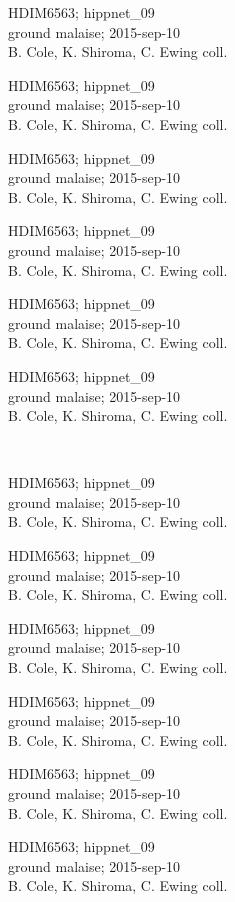 \documentclass[2pt]{extarticle}
\begin{document}
\noindent
\parbox{0.16\textwidth}{\tiny \raggedright \rule[-0.3\baselineskip]{0pt}{10pt}HDIM6563; hippnet\_09\\ ground malaise; 2015-sep-10\\ B. Cole, K. Shiroma, C. Ewing coll.}
\parbox{0.16\textwidth}{\tiny \raggedright \rule[-0.3\baselineskip]{0pt}{10pt}HDIM6563; hippnet\_09\\ ground malaise; 2015-sep-10\\ B. Cole, K. Shiroma, C. Ewing coll.}
\parbox{0.16\textwidth}{\tiny \raggedright \rule[-0.3\baselineskip]{0pt}{10pt}HDIM6563; hippnet\_09\\ ground malaise; 2015-sep-10\\ B. Cole, K. Shiroma, C. Ewing coll.}
\parbox{0.16\textwidth}{\tiny \raggedright \rule[-0.3\baselineskip]{0pt}{10pt}HDIM6563; hippnet\_09\\ ground malaise; 2015-sep-10\\ B. Cole, K. Shiroma, C. Ewing coll.}
\parbox{0.16\textwidth}{\tiny \raggedright \rule[-0.3\baselineskip]{0pt}{10pt}HDIM6563; hippnet\_09\\ ground malaise; 2015-sep-10\\ B. Cole, K. Shiroma, C. Ewing coll.}
\parbox{0.16\textwidth}{\tiny \raggedright \rule[-0.3\baselineskip]{0pt}{10pt}HDIM6563; hippnet\_09\\ ground malaise; 2015-sep-10\\ B. Cole, K. Shiroma, C. Ewing coll.} \\ 
\vspace{0.001in} 

\noindent
\parbox{0.16\textwidth}{\tiny \raggedright \rule[-0.3\baselineskip]{0pt}{10pt}HDIM6563; hippnet\_09\\ ground malaise; 2015-sep-10\\ B. Cole, K. Shiroma, C. Ewing coll.}
\parbox{0.16\textwidth}{\tiny \raggedright \rule[-0.3\baselineskip]{0pt}{10pt}HDIM6563; hippnet\_09\\ ground malaise; 2015-sep-10\\ B. Cole, K. Shiroma, C. Ewing coll.}
\parbox{0.16\textwidth}{\tiny \raggedright \rule[-0.3\baselineskip]{0pt}{10pt}HDIM6563; hippnet\_09\\ ground malaise; 2015-sep-10\\ B. Cole, K. Shiroma, C. Ewing coll.}
\parbox{0.16\textwidth}{\tiny \raggedright \rule[-0.3\baselineskip]{0pt}{10pt}HDIM6563; hippnet\_09\\ ground malaise; 2015-sep-10\\ B. Cole, K. Shiroma, C. Ewing coll.}
\parbox{0.16\textwidth}{\tiny \raggedright \rule[-0.3\baselineskip]{0pt}{10pt}HDIM6563; hippnet\_09\\ ground malaise; 2015-sep-10\\ B. Cole, K. Shiroma, C. Ewing coll.}
\parbox{0.16\textwidth}{\tiny \raggedright \rule[-0.3\baselineskip]{0pt}{10pt}HDIM6563; hippnet\_09\\ ground malaise; 2015-sep-10\\ B. Cole, K. Shiroma, C. Ewing coll.} \\ 
\vspace{0.001in} 
\end{document}
